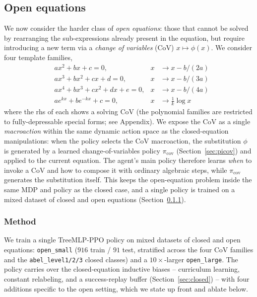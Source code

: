 \documentclass{article}
\theoremstyle{plain}
\theoremstyle{definition}
\theoremstyle{remark}
\begin{document}
\subsection{Open equations}
\label{sec:open}
We now consider the harder class of \emph{open equations}: those that cannot be solved by rearranging the sub-expressions already present in the equation, but require introducing a new term via a \emph{change of variables} (CoV) $x \mapsto \phi(x)$. We consider four template families,
\begin{align}
    & a x^2 + b x + c = 0, & x &\to x - b/(2a) \\
    & a x^3 + b x^2 + c x + d = 0, & x &\to x - b/(3a) \\
    & a x^4 + b x^3 + c x^2 + d x + e = 0, & x &\to x - b/(4a) \\
    & a e^{k x} + b e^{-k x} + c = 0, & x &\to \tfrac{1}{k}\log x
\end{align}
where the rhs of each shows a solving CoV (the polynomial families are restricted to fully-depressable special forms; see Appendix). We expose the CoV as a single \emph{macroaction} within the same dynamic action space as the closed-equation manipulations: when the policy selects the CoV macroaction, the substitution $\phi$ is generated by a learned change-of-variables policy $\pi_{\mathrm{cov}}$ (Section~\ref{sec:picov}) and applied to the current equation. The agent's main policy therefore learns \emph{when} to invoke a CoV and how to compose it with ordinary algebraic steps, while $\pi_{\mathrm{cov}}$ generates the substitution itself. This keeps the open-equation problem inside the same MDP and policy as the closed case, and a single policy is trained on a mixed dataset of closed and open equations (Section~\ref{sec:open_method}).

\subsubsection{Method}
\label{sec:open_method}
We train a single TreeMLP-PPO policy on mixed datasets of closed and open equations: \texttt{open\_small} ($916$ train / $91$ test, stratified across the four CoV families and the \texttt{abel\_level1/2/3} closed classes) and a $10\times$-larger \texttt{open\_large}. The policy carries over the closed-equation inductive biases -- curriculum learning, constant relabeling, and a success-replay buffer (Section~\ref{sec:closed}) -- with four additions specific to the open setting, which we state up front and ablate below.
\end{document}
